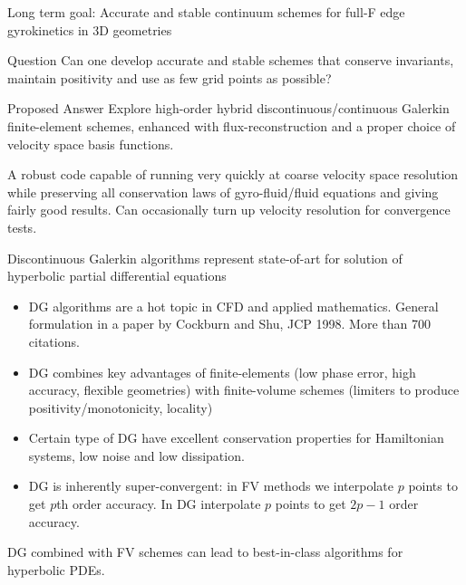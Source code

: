 \documentclass[pdf]{beamer}
\newcommand{\mypause}{}
\theoremstyle{definition}
\begin{document}
\begin{frame}{Long term goal: Accurate and stable continuum schemes
    for full-F edge gyrokinetics in 3D geometries}

  \begin{block}{Question}
    Can one develop accurate and stable schemes that conserve
    invariants, maintain positivity and use as few grid points as
    possible?
  \end{block}

  \begin{block}{Proposed Answer}
    Explore high-order hybrid discontinuous/continuous Galerkin
    finite-element schemes, enhanced with flux-reconstruction and a
    proper choice of velocity space basis functions.
  \end{block}
  \mypause
  A robust code capable of running very quickly at coarse velocity
  space resolution while preserving all conservation laws of
  gyro-fluid/fluid equations and giving fairly good results. Can
  occasionally turn up velocity resolution for convergence tests.

\end{frame}

\begin{frame}{Discontinuous Galerkin algorithms represent state-of-art
    for solution of hyperbolic partial differential equations}
  \begin{itemize}
  \item DG algorithms are a hot topic in CFD and applied
    mathematics. General formulation in a paper by Cockburn and Shu,
    JCP 1998. More than 700 citations.  \mypause
  \item DG combines key advantages of finite-elements (low phase
    error, high accuracy, flexible geometries) with finite-volume
    schemes (limiters to produce positivity/monotonicity, locality)
    \mypause
  \item Certain type of DG have excellent conservation properties for
    Hamiltonian systems, low noise and low dissipation.
    \mypause
  \item DG is inherently super-convergent: in FV methods we
    interpolate $p$ points to get $p$th order accuracy. In DG
    interpolate $p$ points to get $2p-1$ order accuracy.
  \end{itemize}
  DG combined with FV schemes can lead to best-in-class algorithms
  for hyperbolic PDEs.

\end{frame}
\end{document}
